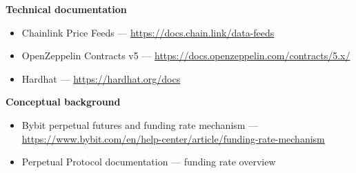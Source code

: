\documentclass[11pt,a4paper]{article}
\begin{document}
\textbf{Technical documentation}
\begin{itemize}
    \item Chainlink Price Feeds --- \url{https://docs.chain.link/data-feeds}
    \item OpenZeppelin Contracts v5 --- \url{https://docs.openzeppelin.com/contracts/5.x/}
    \item Hardhat --- \url{https://hardhat.org/docs}
\end{itemize}

\textbf{Conceptual background}
\begin{itemize}
    \item Bybit perpetual futures and funding rate mechanism --- \url{https://www.bybit.com/en/help-center/article/funding-rate-mechanism}
    \item Perpetual Protocol documentation --- funding rate overview
\end{itemize}

\end{document}
